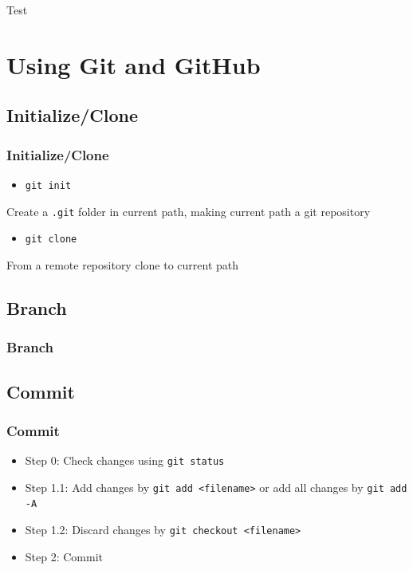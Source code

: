 \documentclass{beamer}
\begin{document}
			Test

	\section{Using Git and GitHub}
		\subsection{Initialize/Clone}
			\begin{frame}
				\frametitle{Initialize/Clone}
				\begin{itemize}
					\item \texttt{git init}
				\end{itemize}
				Create a \texttt{.git} folder in current path, making current path a git repository

				\begin{itemize}
					\item \texttt{git clone}
				\end{itemize}
				From a remote repository clone to current path
			\end{frame}

		\subsection{Branch}
			\begin{frame}
				\frametitle{Branch}
			\end{frame}

		\subsection{Commit}
			\begin{frame}
				\frametitle{Commit}
				\begin{itemize}
					\item Step 0: Check changes using \texttt{git status}
					\item Step 1.1: Add changes by \texttt{git add <filename>} or add all changes by \texttt{git add -A}
					\item Step 1.2: Discard changes by \texttt{git checkout <filename>}
					\item Step 2: Commit
				\end{itemize}
			\end{frame}
\end{document}
